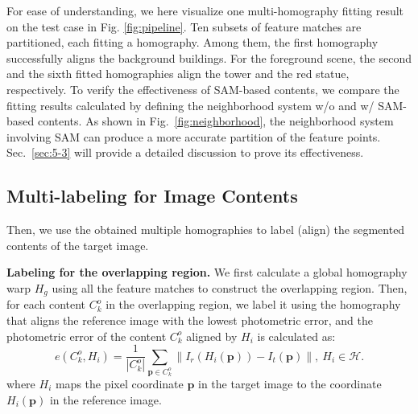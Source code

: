 \documentclass[10pt,twocolumn,letterpaper]{article}
\begin{document}
For ease of understanding, we here visualize one multi-homography fitting result on the test case \cite{zhang2014parallax} in Fig. \ref{fig:pipeline}. Ten subsets of feature matches are partitioned, each fitting a homography. Among them, the first homography successfully aligns the background buildings. For the foreground scene, the second and the sixth fitted homographies align the tower and the red statue, respectively. To verify the effectiveness of SAM-based contents, we compare the fitting results calculated by defining the neighborhood system w/o and w/ SAM-based contents. 
As shown in Fig.~\ref{fig:neighborhood}, the neighborhood system involving SAM can produce a more accurate partition of the feature points. Sec.~\ref{sec:5-3} will provide a detailed discussion to prove its effectiveness.

\subsection{Multi-labeling for Image Contents}

Then, we use the obtained multiple homographies to label (align) the segmented contents of the target image. 

\noindent\textbf{Labeling for the overlapping region.} We first calculate a global homography warp $H_g$ using all the feature matches to construct the overlapping region. Then, for each content $C^o_k$ in the overlapping region, we label it using the homography that aligns the reference image with the lowest photometric error, and the photometric error of the content $C^o_k$ aligned by $H_i$ is calculated as:
\begin{equation}
	e(C_k^o, H_i)=\frac{1}{|C^o_k|}\sum_{\mathbf{p}\in C^o_k}\|I_r(H_i(\mathbf{p}))-I_t(\mathbf{p})\|,\ H_i\in \mathcal{H}.
	\label{eq:2}
\end{equation}
where $H_i$ maps the pixel coordinate $\mathbf{p}$ in the target image to the coordinate $H_i(\mathbf{p})$ in the reference image. 
\end{document}
